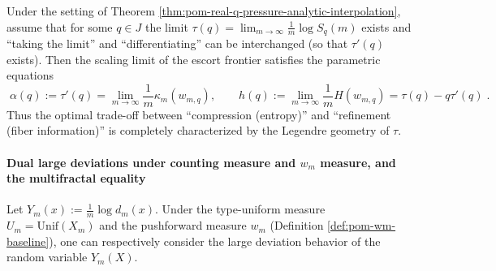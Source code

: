 \begin{corollary}\label{cor:pom-escort-frontier-limit-param}
Under the setting of Theorem \ref{thm:pom-real-q-pressure-analytic-interpolation}, assume that for some \(q\in J\) the limit
\(
\tau(q)=\lim_{m\to\infty}\frac{1}{m}\log S_q(m)
\)
exists and ``taking the limit'' and ``differentiating'' can be interchanged (so that \(\tau'(q)\) exists).
Then the scaling limit of the escort frontier satisfies the parametric equations
\[
\boxed{\;
\alpha(q):=\tau'(q)=\lim_{m\to\infty}\frac{1}{m}\kappa_m(w_{m,q}),\qquad
h(q):=\lim_{m\to\infty}\frac{1}{m}H(w_{m,q})=\tau(q)-q\tau'(q)\; }.
\]
Thus the optimal trade-off between ``compression (entropy)'' and ``refinement (fiber information)'' is completely characterized by the Legendre geometry of \(\tau\).
\end{corollary}

\paragraph{Dual large deviations under counting measure and \texorpdfstring{$w_m$}{wm} measure, and the multifractal equality}
Let
\(
Y_m(x):=\frac{1}{m}\log d_m(x)
\).
Under the type-uniform measure \(U_m=\mathrm{Unif}(X_m)\) and the pushforward measure \(w_m\) (Definition \ref{def:pom-wm-baseline}),
one can respectively consider the large deviation behavior of the random variable \(Y_m(X)\).

